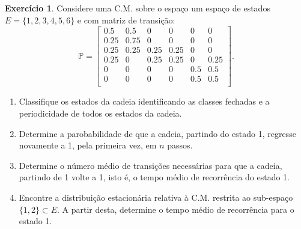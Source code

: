 \documentclass[
  11pt,
  a4paper,
]{book}
\theoremstyle{definition}
\theoremstyle{definition}
\theoremstyle{definition}
\newtheorem{exercise}{Exercício}[chapter]
\theoremstyle{definition}
\theoremstyle{remark}
\begin{document}
\begin{exercise}

Considere uma C.M. sobre o espaço um espaço de estados \(E=\{1,2,3,4,5,6\}\) e com matriz de transição:
\[
\mathbb{P} =
\begin{bmatrix}
0.5 & 0.5 & 0 & 0 & 0 & 0  \\
0.25 & 0.75 & 0 & 0 & 0 & 0  \\
0.25 & 0.25 & 0.25 & 0.25 & 0 & 0  \\
0.25 & 0 & 0.25 & 0.25 & 0 & 0.25  \\
0 & 0 & 0 & 0 & 0.5 & 0.5  \\
0 & 0 & 0 & 0 & 0.5 & 0.5  \\
\end{bmatrix}.
\]

\begin{enumerate}
\def\labelenumi{(\alph{enumi})}
\item
  Classifique os estados da cadeia identificando as classes fechadas e a periodicidade de todos os estados da cadeia.
\item
  Determine a parobabilidade de que a cadeia, partindo do estado 1, regresse novamente a 1, pela primeira vez, em \(n\) passos.
\item
  Determine o número médio de transições necessárias para que a cadeia, partindo de 1 volte a 1, isto é, o tempo médio de recorrência do estado 1.
\item
  Encontre a distribuição estacionária relativa à C.M. restrita ao sub-espaço \(\{1,2\} \subset E\). A partir desta, determine o tempo médio de recorrência para o estado 1.
\end{enumerate}

\end{exercise}

\(\,\)
\end{document}
